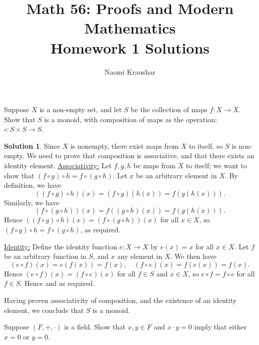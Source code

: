 \documentclass[12pt]{article}
\theoremstyle{definition}
\theoremstyle{definition}
\newtheorem*{soln}{Solution}
\begin{document}
\title{Math 56: Proofs and Modern Mathematics\\ Homework 1 Solutions}
\author{Naomi Kraushar}
\maketitle

\begin{prob}
Suppose $X$ is a non-empty set, and let $S$ be the collection of maps $f:X\to X$. Show that $S$ is a monoid, with composition of maps as the operation: $\circ:S\times S\to S$.
\end{prob}

\begin{soln}
Since $X$ is nonempty, there exist maps from $X$ to itself, so $S$ is non-empty. We need to prove that composition is associative, and that there exists an identity element.
\underline{Associativity:} Let $f,g,h$ be maps from $X$ to itself; we want to show that $(f\circ g)\circ h = f\circ (g\circ h)$. Let $x$ be an arbitrary element in $X$. By definition, we have
\[((f\circ g)\circ h)(x)=(f\circ g)(h(x))=f(g(h(x))).\]
Similarly, we have
\[(f\circ(g\circ h))(x)=f((g\circ h)(x))=f(g(h(x))).\]
Hence $((f\circ g)\circ h)(x) = (f\circ (g\circ h))(x)$ for all $x\in X$, so $(f\circ g)\circ h = f\circ (g\circ h)$, as required.

\underline{Identity:} Define the identity function $e:X\to X$ by $e(x)=x$ for all $x\in X$. Let $f$ be an arbitrary function in $S$, and $x$ any element in $X$. We then have
\[(e\circ f)(x)=e(f(x))=f(x), \quad (f\circ e)(x)=f(e(x))=f(x).\]
Hence $(e\circ f)(x)=(f\circ e)(x)$ for all $f\in S$ and $x\in X$, so $e\circ f=f\circ e$ for all $f\in S$. Hence   and as required.

Having proven associativity of composition, and the existence of an identity element, we conclude that $S$ is a monoid.
\end{soln}

\begin{prob}
Suppose $(F,+,\cdot)$ is a field.  Show that $x,y\in F$ and $x\cdot y= 0$ imply that either $x=0$ or $y=0$. 
\end{prob}
\end{document}

